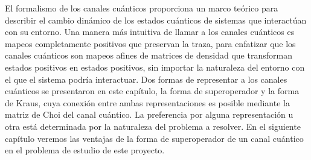 El formalismo de los canales cuánticos proporciona un marco 
teórico para describir el cambio dinámico de los estados cuánticos 
de sistemas que interactúan con su entorno. Una manera 
más intuitiva de llamar a los canales cuánticos es mapeos 
completamente positivos que preservan la traza, para enfatizar 
que los canales cuánticos son mapeos afines de matrices de 
densidad que transforman estados positivos en estados positivos,
sin importar la naturaleza del entorno con el que el sistema podría
interactuar. Dos formas de representar a los canales cuánticos
se presentaron en este capítulo, la forma de superoperador y 
la forma de Kraus, cuya conexión entre ambas representaciones
es posible mediante la matriz de Choi del canal cuántico. 
La preferencia por alguna representación u otra está determinada 
por la naturaleza del problema a resolver. 
En el siguiente capítulo veremos las ventajas de la forma de superoperador 
de un canal cuántico en el problema de estudio de este proyecto. 

